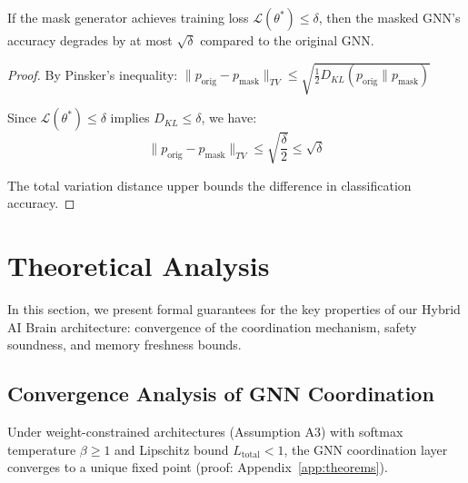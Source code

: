 \documentclass{article}
\begin{document}
\begin{theorem}
If the mask generator achieves training loss $\mathcal{L}(\theta^*) \leq \delta$, then the masked GNN's accuracy degrades by at most $\sqrt{\delta}$ compared to the original GNN.
\end{theorem}

\begin{proof}
By Pinsker's inequality: $\|p_{\text{orig}} - p_{\text{mask}}\|_{TV} \leq \sqrt{\frac{1}{2}D_{KL}(p_{\text{orig}} \| p_{\text{mask}})}$

Since $\mathcal{L}(\theta^*) \leq \delta$ implies $D_{KL} \leq \delta$, we have:
\begin{equation}
\|p_{\text{orig}} - p_{\text{mask}}\|_{TV} \leq \sqrt{\frac{\delta}{2}} \leq \sqrt{\delta}
\end{equation}

The total variation distance upper bounds the difference in classification accuracy.
\end{proof}


\section{Theoretical Analysis}
\label{sec:theoretical_analysis}

In this section, we present formal guarantees for the key properties of our Hybrid AI Brain architecture: convergence of the coordination mechanism, safety soundness, and memory freshness bounds.

\subsection{Convergence Analysis of GNN Coordination}
\label{sec:gnn-coordination}

\begin{theorem}
\label{thm:gnn_convergence}
Under weight-constrained architectures (Assumption A3) with softmax temperature $\beta \geq 1$ and Lipschitz bound $L_{\text{total}} < 1$, the GNN coordination layer converges to a unique fixed point (proof: Appendix~\ref{app:theorems}).
\end{theorem}
\end{document}
